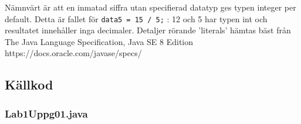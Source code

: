 
\par Nämnvärt är att en inmatad siffra utan specifierad datatyp ges typen integer
per default. Detta är fallet för \texttt{data5 = 15 / 5;} : 12 och 5 har typen int och
resultatet innehåller inga decimaler.
Detaljer rörande 'literals' hämtas bäst från
The Java Language Specification, Java SE 8 Edition
https://docs.oracle.com/javase/specs/



\subsection{Källkod}\label{subsection-1}
\subsubsection*{Lab1Uppg01.java}
\inputminted[]{java}{src/Lab1Uppg01.java}


